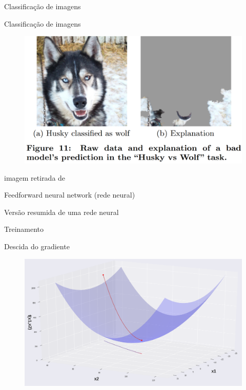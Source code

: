\documentclass[10pt]{beamer}
\begin{document}
\begin{frame}[fragile]{Classificação de imagens}


\end{frame}

\begin{frame}[fragile]{Classificação de imagens}
\begin{figure}
\centering
\includegraphics[width=1.0\linewidth]{images/wolf.png}
\end{figure}
\footnotesize{imagem retirada de \cite{Ribeiro:2016:WIT:2939672.2939778}}
\end{frame}


\begin{frame}[fragile]{Feedforward neural network  (rede neural)}

\end{frame}

\begin{frame}[fragile]{Versão resumida de uma rede neural}

\end{frame}

\begin{frame}{Treinamento}

\end{frame}


\begin{frame}[fragile]{Descida do gradiente}
\begin{figure}
\centering
\includegraphics[width=1.0\linewidth]{images/Minimization_image.png}
\end{figure}
\end{frame}
\end{document}
